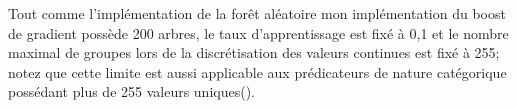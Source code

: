 Tout comme l'implémentation de la forêt aléatoire mon implémentation du boost de gradient possède 200 arbres, le taux d'apprentissage est fixé à 0,1 et le nombre maximal de groupes lors de la discrétisation des valeurs continues est fixé à 255; notez que cette limite est aussi applicable aux prédicateurs de nature catégorique possédant plus de 255 valeurs uniques(\cite{diarra2024gradient}).
